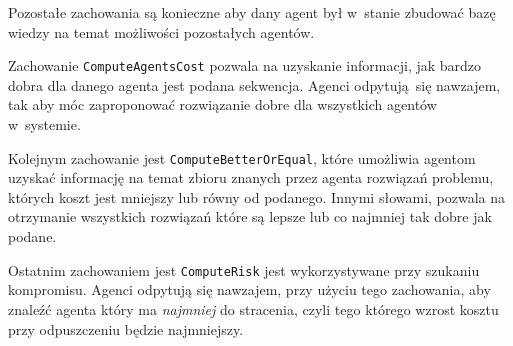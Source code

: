 Pozostałe zachowania są konieczne aby dany agent był w~stanie zbudować bazę wiedzy na temat możliwości pozostałych agentów.

Zachowanie \texttt{ComputeAgentsCost} pozwala na uzyskanie informacji, jak bardzo dobra dla danego agenta jest podana sekwencja.
Agenci odpytują się nawzajem, tak aby móc zaproponować rozwiązanie dobre dla wszystkich agentów w~systemie. 

Kolejnym zachowanie jest \texttt{ComputeBetterOrEqual}, które  umożliwia agentom uzyskać informację na temat zbioru znanych przez agenta rozwiązań problemu, których koszt jest mniejszy lub równy od podanego. Innymi słowami, pozwala na otrzymanie wszystkich rozwiązań które są lepsze lub co najmniej tak dobre jak podane.

Ostatnim zachowaniem jest \texttt{ComputeRisk} jest wykorzystywane przy szukaniu kompromisu. Agenci odpytują się nawzajem, przy użyciu tego zachowania, aby znaleźć agenta który ma \textit{najmniej} do stracenia, czyli tego którego wzrost kosztu przy odpuszczeniu będzie najmniejszy.